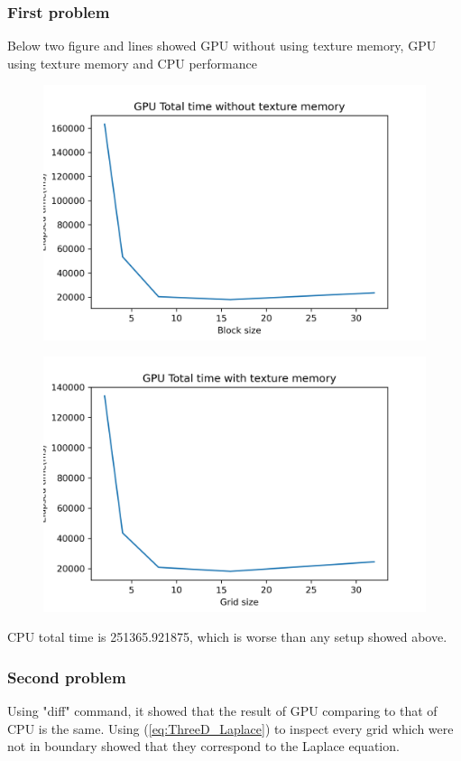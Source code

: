 \documentclass{article}
\begin{document}
	\subsubsection{First problem}
	\newpage
	Below two figure and lines showed GPU without using texture memory, GPU using texture memory and CPU performance
	\begin{figure}
		\centering
		\includegraphics[width=\linewidth]{notebook/gpu_total_time}
	\end{figure}
	\begin{figure}[hb!]
		\centering
		\includegraphics[width=\linewidth]{notebook/gpu_total_time_texture}
	\end{figure}

	CPU total time is 251365.921875, which is worse than any setup showed above.
	\subsubsection{Second problem}
	Using "diff" command, it showed that the result of GPU comparing to that of CPU is the same. Using (\ref{eq:ThreeD_Laplace}) to inspect every grid which were not in boundary showed that they correspond to the Laplace equation.
\end{document}
